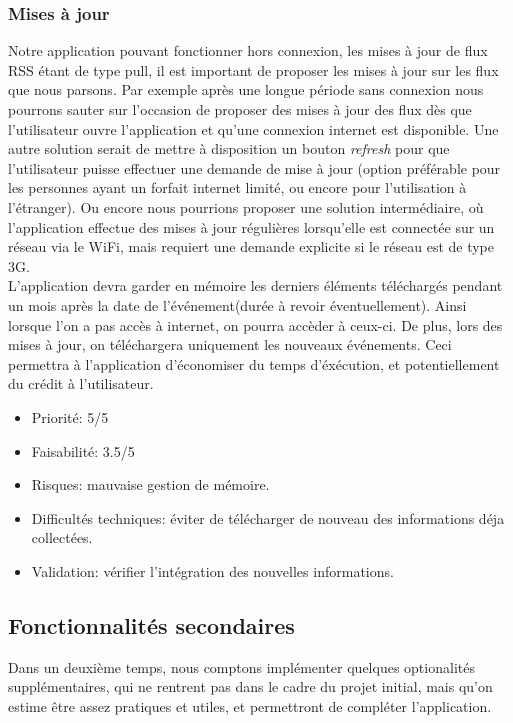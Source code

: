 \documentclass [pdftex,12pt] {report}
\begin{document}
\subsubsection{Mises à jour}
Notre application pouvant fonctionner hors connexion, les mises à jour de flux RSS étant de type pull, il est important de proposer les mises à jour sur les flux que nous parsons. Par exemple après une longue période sans connexion nous pourrons sauter sur l'occasion de proposer des mises à jour des flux dès que l'utilisateur ouvre l'application et qu'une connexion internet est disponible. Une autre solution serait de mettre à disposition un bouton \emph{refresh} pour que l'utilisateur puisse effectuer une demande de mise à jour (option préférable pour les personnes ayant un forfait internet limité, ou encore pour l'utilisation à l'étranger). Ou encore nous pourrions proposer une solution intermédiaire, où l'application effectue des mises à jour régulières lorsqu'elle est connectée sur un réseau via le WiFi, mais requiert une demande explicite si le réseau est de type 3G. \\
L'application devra garder en mémoire les derniers éléments téléchargés pendant un mois après la date de l'événement(durée à revoir éventuellement). Ainsi lorsque l'on a pas accès à internet, on pourra accèder à ceux-ci. De plus, lors des mises à jour, on téléchargera uniquement les nouveaux événements. Ceci permettra à l'application d'économiser du temps d'éxécution, et potentiellement du crédit à l'utilisateur.

\begin{itemize}
\renewcommand{\labelitemi}{$\bullet$}
\item Priorité: 5/5
\item Faisabilité: 3.5/5
\item Risques: mauvaise gestion de mémoire.
\item Difficultés techniques: éviter de télécharger de nouveau des informations déja collectées.
\item Validation: vérifier l'intégration des nouvelles informations.
\end{itemize}


\subsection{Fonctionnalités secondaires}
Dans un deuxième temps, nous comptons implémenter quelques optionalités supplémentaires, qui ne rentrent pas dans le cadre du projet initial, mais qu'on estime être assez pratiques et utiles, et permettront de compléter l'application.
\end{document}
